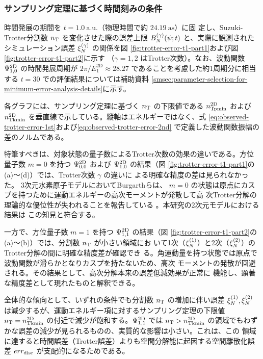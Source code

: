 \documentclass[wabun2025.tex]{subfiles}
\begin{document}
\subsubsection{サンプリング定理に基づく時間刻みの条件}
\label{subsubsec:deltat-selection-results}

時間発展の期間を $t=1.0\ \mathrm{a.u.}$（物理時間で約 $24.19\ \mathrm{as}$）に固
定し、Suzuki-Trotter分割数 $n_{\mathrm{T}}$ を変化させた際の誤差上限 $B_{N}^{(\gamma)}(\psi;t)$
と、実際に観測されたシミュレーション誤差 $\xi_{N}^{(\gamma)}$ の関係を図
\ref{fig:trotter-error-t1-part1}および図\ref{fig:trotter-error-t1-part2}に示す
（$\gamma=1,2$ はTrotter次数）。なお、波動関数 $\Psi^{\mathrm{2D}}_{1,0}$ の時間発展周期が
$2\pi/E_1^{\mathrm{2D}} \approx 28.27$ であることを考慮した約1周期分に相当する
$t=30$ での評価結果については補助資料
\ref{smsec:parameter-selection-for-minimum-error-analysis-details}に示す。

各グラフには、サンプリング定理に基づく $n_{\mathrm{T}}$ の下限値である $n_{\mathrm{Tpmin}}^{\mathrm{2D}}$ および
$n_{\mathrm{Tkmin}}^{\mathrm{2D}}$ を垂直線で示している。縦軸はエネルギーではなく、式
\eqref{eq:observed-trotter-error-1st}および\eqref{eq:observed-trotter-error-2nd}
で定義した波動関数振幅の差のノルムである。

特筆すべきは、対象状態の量子数によるTrotter次数の効果の違いである。方位量子数
$m=0$ を持つ $\Psi^{\mathrm{2D}}_{0,0}$ および $\Psi^{\mathrm{2D}}_{1,0}$ の結果（図
\ref{fig:trotter-error-t1-part1}の(a)〜(d)）では、Trotter次数 $\gamma$ の違いに
よる明確な精度の差は見られなかった。 3次元水素原子モデルにおいてBurgarthらは、
$m=0$ の状態は原点にカスプを持つために運動エネルギーの高次モーメントが発散して高
次Trotter分解の理論的な優位性が失われることを報告している
\cite{Burgarth2024.PhysRevResearch.6.043155}。本研究の2次元モデルにおける結果は
この知見と符合する。

一方で、方位量子数 $m=1$ を持つ $\Psi^{\mathrm{2D}}_{1,1}$ の結果（図
\ref{fig:trotter-error-t1-part2}の(a)〜(b)）では、分割数 $n_{\mathrm{T}}$ が小さい領域にお
いて1次（$\xi_{N}^{(1)}$）と2次（$\xi_{N}^{(2)}$）のTrotter分解の間に明確な精度差が確認でき
る。角運動量を持つ状態では原点で波動関数が滑らかとなりカスプを持たないため、高次
モーメントの発散が回避される。その結果として、高次分解本来の誤差低減効果が正常に
機能し、顕著な精度差として現れたものと解釈できる。

全体的な傾向として、いずれの条件でも分割数 $n_{\mathrm{T}}$ の増加に伴い誤差 $\xi_{N}^{(1)},
\xi_{N}^{(2)}$ は減少するが、運動エネルギー項に対するサンプリング定理の下限値 $n_{\mathrm{T}} =
n_{\mathrm{Tkmin}}^{\mathrm{2D}}$ の付近で減少が飽和する。$\Psi^{\mathrm{2D}}_{1,1}$ では $n_{\mathrm{T}} > n_{\mathrm{Tkmin}}^{\mathrm{2D}}$
の領域でもわずかな誤差の減少が見られるものの、実質的な影響は小さい。これは、この
領域に達すると時間誤差（Trotter誤差）よりも空間分解能に起因する空間離散化誤差
$err_{\mathrm{disc}}$ が支配的になるためである。
\end{document}

